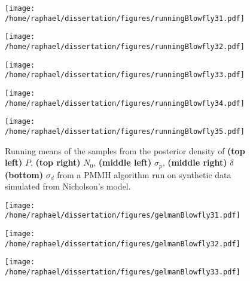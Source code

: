 \documentclass[12pt]{article}
\begin{document}
\begin{appendices}
	\begin{figure}[htb]
		\centering
		\begin{minipage}{0.49\textwidth}
			\centering
			\texttt{[image: /home/raphael/dissertation/figures/runningBlowfly31.pdf]}
		\end{minipage}
		\begin{minipage}{0.49\textwidth}
			\centering
			\texttt{[image: /home/raphael/dissertation/figures/runningBlowfly32.pdf]}
		\end{minipage}
		\begin{minipage}{0.49\textwidth}
			\centering
			\texttt{[image: /home/raphael/dissertation/figures/runningBlowfly33.pdf]}
		\end{minipage}
		\begin{minipage}{0.49\textwidth}
			\centering
			\texttt{[image: /home/raphael/dissertation/figures/runningBlowfly34.pdf]}
		\end{minipage}
		\begin{minipage}{0.49\textwidth}
			\centering
			\texttt{[image: /home/raphael/dissertation/figures/runningBlowfly35.pdf]}
		\end{minipage}
		\caption[Running means of the samples from a PMMH algorithm run on synthetic data, Nicholson's model]{Running means of the samples from the posterior density of \textbf{(top left)} $P$, \textbf{(top right)} $N_0$,  \textbf{(middle left)} $\sigma_p$,  \textbf{(middle right)} $\delta$ \textbf{(bottom)} $\sigma_d$ from a PMMH algorithm run on synthetic data simulated from Nicholson's model.}
		\label{fig:rmBlowfly}
	\end{figure}
	\begin{figure}[htb]
		\centering
		\begin{minipage}{0.49\textwidth}
			\centering
			\texttt{[image: /home/raphael/dissertation/figures/gelmanBlowfly31.pdf]}
		\end{minipage}
		\begin{minipage}{0.49\textwidth}
			\centering
			\texttt{[image: /home/raphael/dissertation/figures/gelmanBlowfly32.pdf]}
		\end{minipage}
		\begin{minipage}{0.49\textwidth}
			\centering
			\texttt{[image: /home/raphael/dissertation/figures/gelmanBlowfly33.pdf]}
		\end{minipage}
		\begin{minipage}{0.49\textwidth}

\end{minipage}
\end{figure}
\end{appendices}
\end{document}
